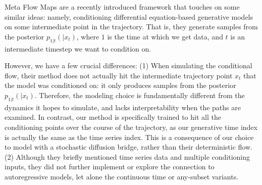 Meta Flow Maps \cite{potaptchik2026metaflowmapsenable} are a recently introduced framework that touches on some similar ideas: namely, conditioning differential equation-based generative models on some intermediate point in the trajectory. That is, they generate samples from the posterior $p_{1|t}(|x_t)$, where $1$ is the time at which we get data, and $t$ is an intermediate timestep we want to condition on.

However, we have a few crucial differences:
(1) When simulating the conditional flow, their method does not actually hit the intermediate trajectory point $x_t$ that the model was conditioned on: it only produces samples from the posterior $p_{1 | t}(| x_t)$. Therefore, the modeling choice is fundamentally different from the dynamics it hopes to simulate, and lacks interpretability when the paths are examined. In contrast, our method is specifically trained to hit all the conditioning points over the course of the trajectory, as our generative time index is actually the same as the time series index. This is a consequence of our choice to model with a stochastic diffusion bridge, rather than their deterministic flow.
(2) Although they briefly mentioned time series data and multiple conditioning inputs, they did not further implement or explore the connection to autoregressive models, let alone the continuous time or any-subset variants.
